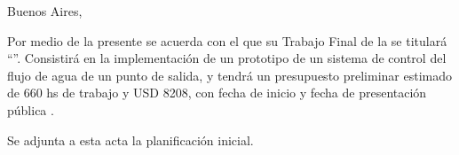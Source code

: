 \documentclass[
11pt, %
codirector, %
]{charter}
\begin{document}
\begin{flushright}
Buenos Aires, \fechaInicioName
\end{flushright}

\vspace{2cm}

Por medio de la presente se acuerda con el \authorname\hspace{1px} que su Trabajo Final de la \degreename\hspace{1px} se titulará ``\ttitle''. Consistirá en la implementación de un prototipo de un sistema de control del flujo de agua de un punto de salida, y tendrá un presupuesto preliminar estimado de 660 hs de trabajo y USD 8208, con fecha de inicio \fechaInicioName\hspace{1px} y fecha de presentación pública \fechaFinalName.

Se adjunta a esta acta la planificación inicial.

\vfill
\end{document}
